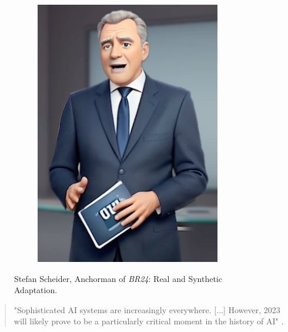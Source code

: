 \documentclass[
  a4paper,  %
  twoside,  %
  bibliography=totoc,
  headsepline,
  cleardoublepage=empty,
  parskip=half,
  draft=false
]{scrbook}
\begin{document}
\begin{figure}[h]
\begin{subfigure}[b]{0.4\textwidth}
    \includegraphics[width=\textwidth]{./graphics/scheider-sd.png}
  \end{subfigure}
  \caption{Stefan Scheider, Anchorman of \textit{BR24}: Real and Synthetic Adaptation.}
  \label{fig:scheider-real-sd}
\end{figure}

\begin{quotation}
"Sophisticated AI systems are increasingly everywhere. [...] However, 2023 will likely prove to be a particularly critical moment in the history of AI" \cite[p. 5]{arguedasAutomatingDemocracyGenerative2023}.
\end{quotation}
\end{document}

